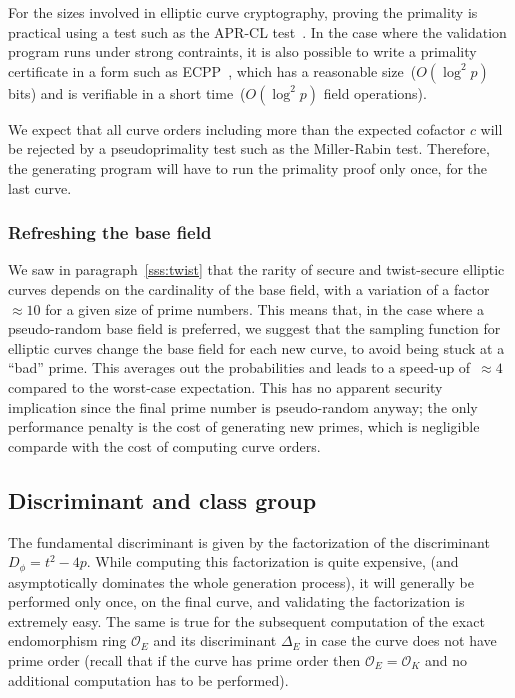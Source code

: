 \documentclass[twocolumn,letterpaper,10pt]{article}
\let\ro\mathcal
\begin{document}
For the sizes involved in elliptic curve cryptography,
proving the primality is practical using a test such as
the APR-CL test~\cite{fcs1980adleman,mc1984cl}.
In the case where the validation program runs under strong contraints,
it is also possible to write a primality certificate
in a form such as ECPP~\cite{mc1993am},
which has a reasonable size~($O(\log^2 p)$ bits)
and is verifiable in a short time~($O(\log^2 p)$ field operations).

We expect that all curve orders including more than the expected cofactor $c$
will be rejected by a pseudoprimality test such as the Miller-Rabin test.
Therefore, the generating program will have to run the primality proof
only once, for the last curve.

\subsubsection{Refreshing the base field}

We saw in paragraph~\ref{sss:twist} that the rarity of
secure and twist-secure elliptic curves depends on the
cardinality of the base field,
with a variation of a factor~$≈ 10$ for a given size of prime numbers.
This means that,
in the case where a pseudo-random base field is preferred,
we suggest that
the sampling function for elliptic curves change the base field
for each new curve, to avoid being stuck at a ``bad'' prime.
This averages out the probabilities
and leads to a speed-up of~$≈ 4$ compared to the worst-case expectation.
This has no apparent security implication
since the final prime number is pseudo-random anyway;
the only performance penalty is the cost of generating new primes,
which is negligible comparde with the cost of computing curve orders.


\subsection{Discriminant and class group}

The fundamental discriminant is given by
the factorization of the discriminant~$D_\phi = t^2 - 4 p$.
While computing this factorization is quite expensive,
(and asymptotically dominates the whole generation process),
it will generally be performed only once, on the final curve,
and validating the factorization is extremely easy.
The same is true for the subsequent computation of the exact endomorphism
ring $\ro O_E$ and its discriminant $\Delta_E$
in case the curve does not have prime order
(recall that if the curve has prime order then $\ro O_E = \ro O_K$
and no additional computation has to be performed).
\end{document}
